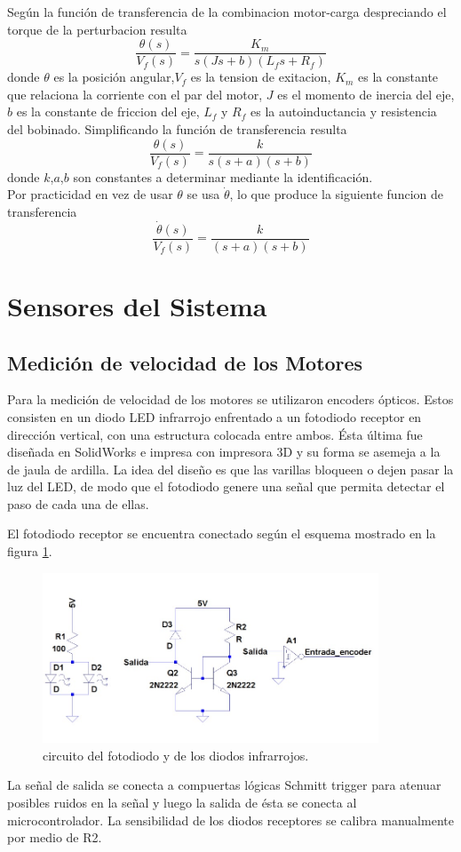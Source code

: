 \documentclass[10pt,conference,a4paper,onecolumn]{article}%
\begin{document}
 Según \cite{dorf} la función de transferencia de la combinacion motor-carga despreciando el torque de la perturbacion resulta
 \begin{equation}
 \frac{\theta(s)}{V_f(s)}=\frac{K_m}{s(Js+b)(L_fs+R_f)}
 \end{equation}
 donde $\theta$ es la posición angular,$V_f$ es la tension de exitacion, $K_m$ es la constante que relaciona la corriente con el par del motor, $J$ es el momento de inercia del eje, $b$ es la constante de friccion del eje, $L_f$  y $R_f$ es la autoinductancia y resistencia del bobinado. Simplificando la función de transferencia resulta
 \begin{equation}
 \frac{\theta(s)}{V_f(s)}=\frac{k}{s(s+a)(s+b)}
 \end{equation}
 donde $k$,$a$,$b$ son constantes a determinar mediante la identificación.\\
 Por practicidad en vez de usar $\theta$ se usa $\dot{\theta}$, lo que produce la siguiente funcion de transferencia
 \begin{equation}
 \frac{\dot{\theta}(s)}{V_f(s)}=\frac{k}{(s+a)(s+b)}
 \end{equation}
  
\section{Sensores del Sistema}
\subsection{Medición de velocidad de los Motores}
Para la medición de velocidad de los motores se utilizaron encoders ópticos. Estos consisten en un diodo LED infrarrojo enfrentado a un fotodiodo receptor en dirección vertical, con una estructura colocada entre ambos. Ésta última fue diseñada en SolidWorks e impresa con impresora 3D y su forma se asemeja a la de jaula de ardilla. La idea del diseño es que las varillas bloqueen o dejen pasar la luz del LED, de modo que el fotodiodo genere una señal que permita detectar el paso de cada una de ellas.

El fotodiodo receptor se encuentra conectado según el esquema mostrado en la figura \ref{fig:circuitoFotodiodo}.
\begin{figure}[h]
\centering
\includegraphics[width=10cm]{./imagenes/circuitoFotodiodo.jpeg}
\caption{circuito del fotodiodo y de los diodos infrarrojos.}
\label{fig:circuitoFotodiodo}
\end{figure}
La señal de salida se conecta a compuertas lógicas Schmitt trigger para atenuar posibles ruidos en la señal y luego la salida de ésta se conecta al microcontrolador. La sensibilidad de los diodos receptores se calibra manualmente por medio de R2.
\end{document}
